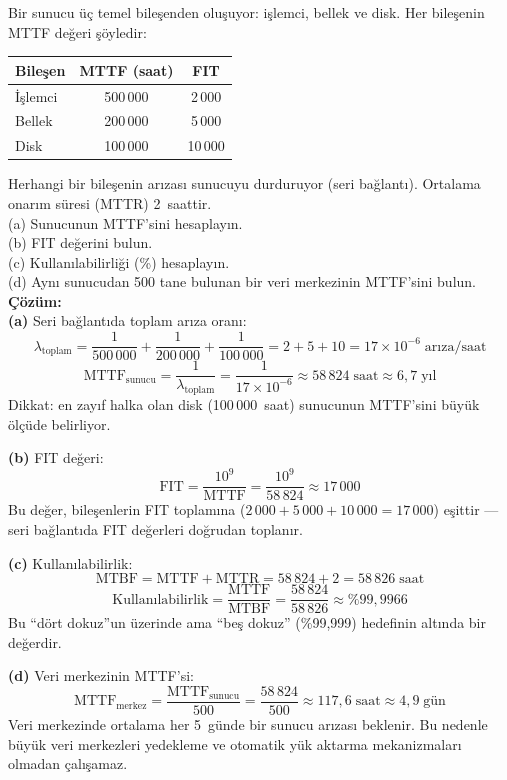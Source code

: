 \begin{ornek}[1.3]
Bir sunucu üç temel bileşenden oluşuyor: işlemci, bellek ve disk. Her bileşenin MTTF değeri şöyledir:
\begin{center}
\small
\begin{tabular}{@{}lcc@{}}
\toprule
\textbf{Bileşen} & \textbf{MTTF (saat)} & \textbf{FIT} \\
\midrule
İşlemci  & 500\,000 & 2\,000 \\
Bellek   & 200\,000 & 5\,000 \\
Disk     & 100\,000 & 10\,000 \\
\bottomrule
\end{tabular}
\end{center}

\noindent Herhangi bir bileşenin arızası sunucuyu durduruyor (seri bağlantı). Ortalama onarım süresi (MTTR) 2~saattir.\\[4pt]
(a) Sunucunun MTTF'sini hesaplayın.\\
(b) FIT değerini bulun.\\
(c) Kullanılabilirliği (\%) hesaplayın.\\
(d) Aynı sunucudan 500 tane bulunan bir veri merkezinin MTTF'sini bulun.\\[6pt]
\textbf{Çözüm:}\\[2pt]
\textbf{(a)} Seri bağlantıda toplam arıza oranı:
\[
\lambda_{\text{toplam}} = \frac{1}{500\,000} + \frac{1}{200\,000} + \frac{1}{100\,000} = 2 + 5 + 10 = 17 \times 10^{-6}\;\text{arıza/saat}
\]
\[
\text{MTTF}_{\text{sunucu}} = \frac{1}{\lambda_{\text{toplam}}} = \frac{1}{17 \times 10^{-6}} \approx 58\,824\;\text{saat} \approx 6{,}7\;\text{yıl}
\]
Dikkat: en zayıf halka olan disk (100\,000~saat) sunucunun MTTF'sini büyük ölçüde belirliyor.

\textbf{(b)} FIT değeri:
\[
\text{FIT} = \frac{10^9}{\text{MTTF}} = \frac{10^9}{58\,824} \approx 17\,000
\]
Bu değer, bileşenlerin FIT toplamına ($2\,000 + 5\,000 + 10\,000 = 17\,000$) eşittir --- seri bağlantıda FIT değerleri doğrudan toplanır.

\textbf{(c)} Kullanılabilirlik:
\[
\text{MTBF} = \text{MTTF} + \text{MTTR} = 58\,824 + 2 = 58\,826\;\text{saat}
\]
\[
\text{Kullanılabilirlik} = \frac{\text{MTTF}}{\text{MTBF}} = \frac{58\,824}{58\,826} \approx \%99{,}9966
\]
Bu ``dört dokuz''un üzerinde ama ``beş dokuz'' (\%99,999) hedefinin altında bir değerdir.

\textbf{(d)} Veri merkezinin MTTF'si:
\[
\text{MTTF}_{\text{merkez}} = \frac{\text{MTTF}_{\text{sunucu}}}{500} = \frac{58\,824}{500} \approx 117{,}6\;\text{saat} \approx 4{,}9\;\text{gün}
\]
Veri merkezinde ortalama her 5~günde bir sunucu arızası beklenir. Bu nedenle büyük veri merkezleri yedekleme ve otomatik yük aktarma mekanizmaları olmadan çalışamaz.
\end{ornek}

